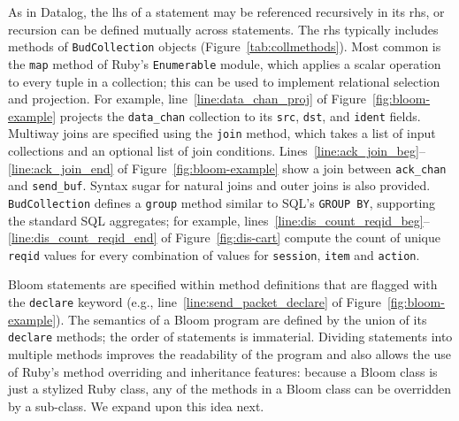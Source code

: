As in Datalog, the lhs of a statement may be referenced recursively in its rhs,
or recursion can be defined mutually across statements.  The rhs typically
includes methods of \texttt{BudCollection} objects (Figure~\ref{tab:collmethods}).  Most common is the
\texttt{map} method of Ruby's \texttt{Enumerable} module, which applies a scalar
operation to every tuple in a collection; this can be used to implement
relational selection and projection. For example, line~\ref{line:data_chan_proj}
of Figure~\ref{fig:bloom-example} projects the \texttt{data\_chan} collection to
its \texttt{src}, \texttt{dst}, and \texttt{ident} fields.  Multiway joins
are specified using the \texttt{join} method, which takes a list of input
collections and an optional list of join conditions.
Lines~\ref{line:ack_join_beg}--\ref{line:ack_join_end} of
Figure~\ref{fig:bloom-example} show a join between \texttt{ack\_chan} and
\texttt{send\_buf}. Syntax sugar for natural joins and outer joins is also
provided. \texttt{BudCollection} defines a \texttt{group} method similar to
SQL's \texttt{GROUP BY}, supporting the standard SQL aggregates; for example,
lines~\ref{line:dis_count_reqid_beg}--\ref{line:dis_count_reqid_end} of
Figure~\ref{fig:dis-cart} compute the count of unique \texttt{reqid} values for
every combination of values for \texttt{session}, \texttt{item} and
\texttt{action}.

Bloom statements are specified within method definitions that are flagged with
the \texttt{declare} keyword (e.g., line~\ref{line:send_packet_declare} of
Figure~\ref{fig:bloom-example}). The semantics of a Bloom program are defined by
the union of its \texttt{declare} methods; the order of statements is
immaterial. Dividing statements into multiple methods improves the readability
of the program and also allows the use of Ruby's method overriding and
inheritance features: because a Bloom class is just a stylized Ruby class, any
of the methods in a Bloom class can be overridden by a sub-class.  We expand upon this idea next.


